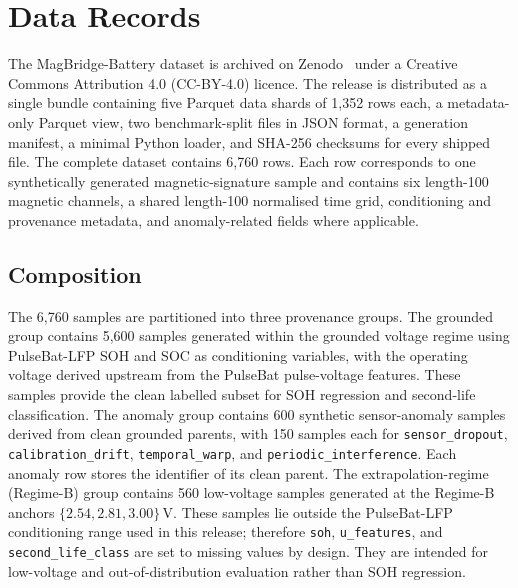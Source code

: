 \documentclass[11pt]{article}
\begin{document}
\section*{Data Records}

The MagBridge-Battery dataset is archived on
Zenodo~\cite{gunasekar2026magbridge_dataset} under a Creative Commons
Attribution 4.0 (CC-BY-4.0) licence. The release is distributed as a single
bundle containing five Parquet data shards of 1,352 rows each, a
metadata-only Parquet view, two benchmark-split files in JSON format, a
generation manifest, a minimal Python loader, and SHA-256 checksums for
every shipped file. The complete dataset contains 6,760 rows. Each row
corresponds to one synthetically generated magnetic-signature sample and
contains six length-100 magnetic channels, a shared length-100 normalised
time grid, conditioning and provenance metadata, and anomaly-related fields
where applicable.

\subsection*{Composition}

The 6,760 samples are partitioned into three provenance groups. The grounded
group contains 5,600 samples generated within the grounded voltage regime
using PulseBat-LFP SOH and SOC as conditioning variables, with the operating
voltage derived upstream from the PulseBat pulse-voltage features. These
samples provide the clean labelled subset for SOH regression and second-life
classification. The anomaly group contains 600 synthetic sensor-anomaly
samples derived from clean grounded parents, with 150 samples each for
\texttt{sensor\_dropout}, \texttt{calibration\_drift},
\texttt{temporal\_warp}, and \texttt{periodic\_interference}. Each anomaly
row stores the identifier of its clean parent. The extrapolation-regime (Regime-B) group contains 560 low-voltage samples generated at the Regime-B anchors
$\{2.54, 2.81, 3.00\}$\,V. These samples lie outside the PulseBat-LFP
conditioning range used in this release; therefore \texttt{soh},
\texttt{u\_features}, and \texttt{second\_life\_class} are set to missing
values by design. They are intended for low-voltage and
out-of-distribution evaluation rather than SOH regression.
\end{document}
